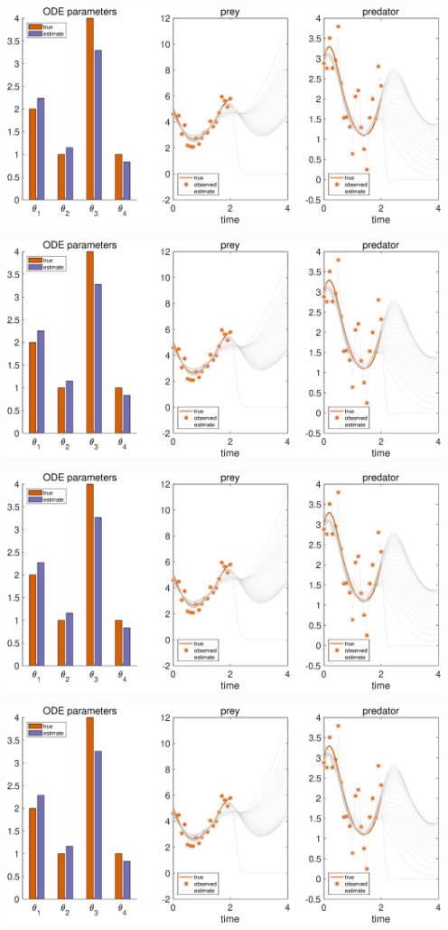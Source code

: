 {\includegraphics [width=5in]{Lotka_Volterra_3_29.eps}

\includegraphics [width=5in]{Lotka_Volterra_3_30.eps}

\includegraphics [width=5in]{Lotka_Volterra_3_31.eps}

\includegraphics [width=5in]{Lotka_Volterra_3_32.eps}

}

